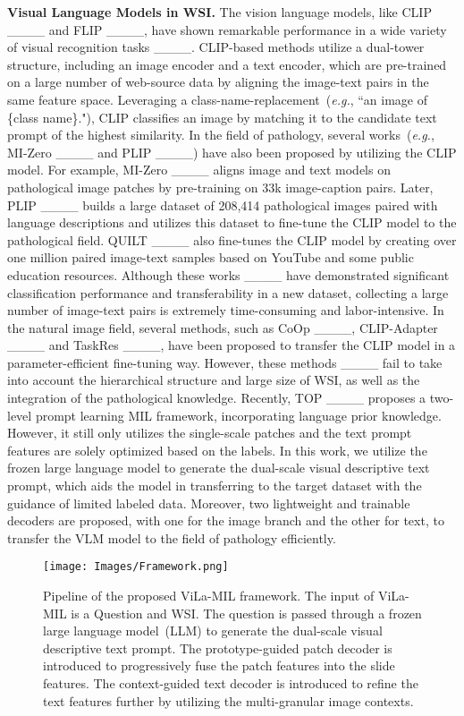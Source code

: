 \noindent\textbf{Visual Language Models in WSI.}
The vision language models, like CLIP ____ and FLIP ____, have shown remarkable performance in a wide variety of visual recognition tasks ____. 
CLIP-based methods utilize a dual-tower structure, including an image encoder and a text encoder, which are pre-trained on a large number of web-source data by aligning the image-text pairs in the same feature space. 
Leveraging a class-name-replacement~(\textit{e.g.}, ``an image of \{class name\}."), CLIP classifies an image by matching it to the candidate text prompt of the highest similarity. 
In the field of pathology, several works~(\textit{e.g.}, MI-Zero ____ and PLIP ____) have also been proposed by utilizing the CLIP model. 
For example, MI-Zero ____ aligns image and text models on pathological image patches by pre-training on 33k image-caption pairs. 
Later, PLIP ____ builds a large dataset of 208,414 pathological images paired with language descriptions and utilizes this dataset to fine-tune the CLIP model to the pathological field. 
QUILT ____ also fine-tunes the CLIP model by creating over one million paired image-text samples based on YouTube and some public education resources.
Although these works ____ have demonstrated significant classification performance and transferability in a new dataset, collecting a large number of image-text pairs is extremely time-consuming and labor-intensive. 
In the natural image field, several methods, such as CoOp ____, CLIP-Adapter ____ and TaskRes ____, have been proposed to transfer the CLIP model in a parameter-efficient fine-tuning way. However, these methods ____ fail to take into account the hierarchical structure and large size of WSI, as well as the integration of the pathological knowledge.  
Recently, TOP ____ proposes a two-level prompt learning MIL framework, incorporating language prior knowledge. However, it still only utilizes the single-scale patches and the text prompt features are solely optimized based on the labels.
In this work, we utilize the frozen large language model to generate the dual-scale visual descriptive text prompt, which aids the model in transferring to the target dataset with the guidance of limited labeled data. Moreover, two lightweight and trainable decoders are proposed, with one for the image branch and the other for text, to transfer the VLM model to the field of pathology efficiently.

\begin{figure*}
\centering
\texttt{[image: Images/Framework.png]}
\caption{
Pipeline of the proposed ViLa-MIL framework. 
The input of ViLa-MIL is a Question and WSI. 
The question is passed through a frozen large language model~(LLM) to generate the dual-scale visual descriptive text prompt. 
The prototype-guided patch decoder is introduced to progressively fuse the patch features into the slide features. 
The context-guided text decoder is introduced to refine the text features further by utilizing the multi-granular image contexts. 
}
\label{framework}
\vspace{-0.5cm}
\end{figure*}
